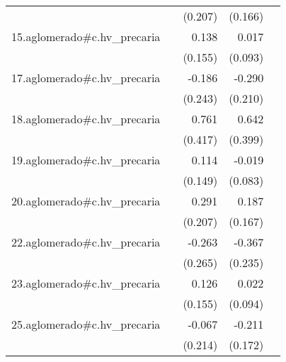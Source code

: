 {\begin{longtable}{l*{4}{D{.}{.}{-1}}}
            &                     &     (0.207)         &     (0.166)         &                     \\
\addlinespace
15.aglomerado#c.hv\_precaria&                     &       0.138         &       0.017         &                     \\
            &                     &     (0.155)         &     (0.093)         &                     \\
\addlinespace
17.aglomerado#c.hv\_precaria&                     &      -0.186         &      -0.290         &                     \\
            &                     &     (0.243)         &     (0.210)         &                     \\
\addlinespace
18.aglomerado#c.hv\_precaria&                     &       0.761         &       0.642         &                     \\
            &                     &     (0.417)         &     (0.399)         &                     \\
\addlinespace
19.aglomerado#c.hv\_precaria&                     &       0.114         &      -0.019         &                     \\
            &                     &     (0.149)         &     (0.083)         &                     \\
\addlinespace
20.aglomerado#c.hv\_precaria&                     &       0.291         &       0.187         &                     \\
            &                     &     (0.207)         &     (0.167)         &                     \\
\addlinespace
22.aglomerado#c.hv\_precaria&                     &      -0.263         &      -0.367         &                     \\
            &                     &     (0.265)         &     (0.235)         &                     \\
\addlinespace
23.aglomerado#c.hv\_precaria&                     &       0.126         &       0.022         &                     \\
            &                     &     (0.155)         &     (0.094)         &                     \\
\addlinespace
25.aglomerado#c.hv\_precaria&                     &      -0.067         &      -0.211         &                     \\
            &                     &     (0.214)         &     (0.172)         &                     \\

\end{longtable}}
